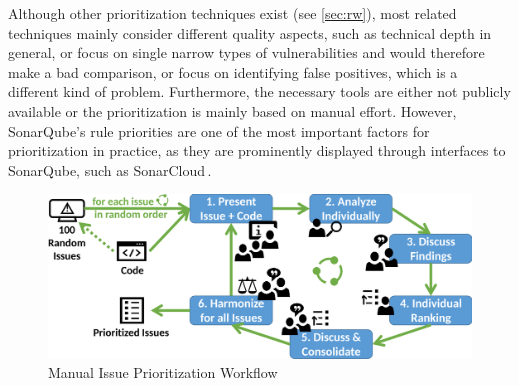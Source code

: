 Although other prioritization techniques exist (see \autoref{sec:rw}), most related techniques mainly consider different quality aspects, such as technical depth in general, or focus on single narrow types of vulnerabilities and would therefore make a bad comparison, or focus on identifying false positives, which is a different kind of problem.
Furthermore, the necessary tools are either not publicly available or the prioritization is mainly based on manual effort.
	However, SonarQube's rule priorities are one of the most important factors for prioritization in practice, as they are prominently displayed through interfaces to SonarQube, such as SonarCloud\,\cite{sonarcloud}.

\begin{figure}
	\centering
	\includegraphics[width=.6\columnwidth]{figures/ManualPrio-KG.png}%
	\caption{Manual Issue Prioritization Workflow}
	\label{fig:ManualPrio}
\end{figure}

